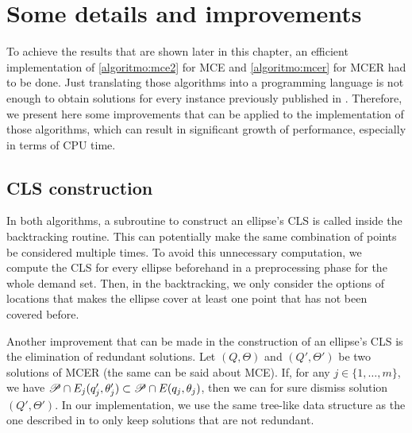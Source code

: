 


\section{Some details and improvements}\label{section:improvements}

To achieve the results that are shown later in this chapter, an efficient implementation of \autoref{algoritmo:mce2} for MCE and \autoref{algoritmo:mcer} for MCER had to be done. Just translating those algorithms into a programming language is not enough to obtain solutions for every instance previously published in .
Therefore, we present here some improvements that can be applied to the implementation of those algorithms, which can result in significant growth of performance, especially in terms of CPU time.

\subsection{CLS construction}

In both algorithms, a subroutine to construct an ellipse's CLS is called inside the backtracking routine. This can potentially make the same combination of points be considered multiple times.
To avoid this unnecessary computation, we compute the CLS for every ellipse beforehand in a preprocessing phase for the whole demand set. Then, in the backtracking, we only consider the options of locations that makes the ellipse cover at least one point that has not been covered before.

Another improvement that can be made in the construction of an ellipse's CLS is the elimination of redundant solutions.
Let $(Q, \Theta)$ and $(Q', \Theta')$ be two solutions of MCER (the same can be said about MCE). If, for any $j \in \{1, \dots, m\}$, we have $\mathscr{P} \cap E_j(q_j', \theta_j') \subset \mathscr{P} \cap E(q_j, \theta_j)$, then we can for sure dismiss solution $(Q', \Theta')$.
In our implementation, we use the same tree-like data structure as the one described in  to only keep solutions that are not redundant.

